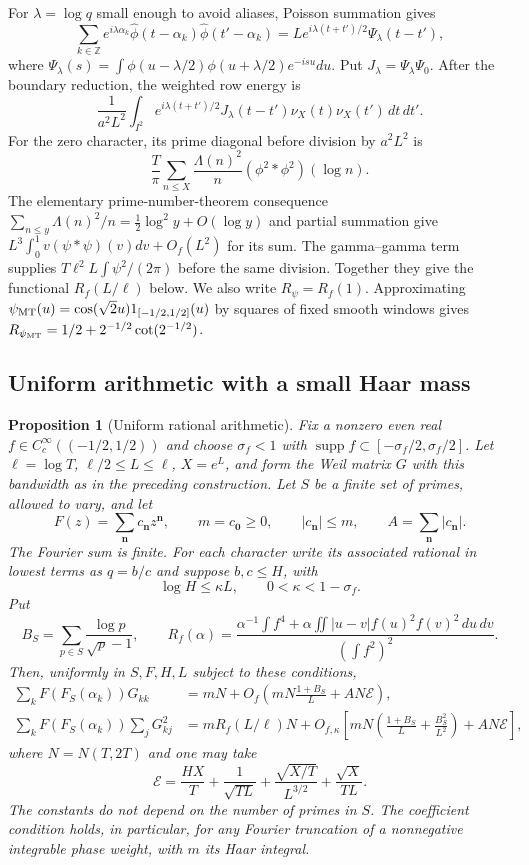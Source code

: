 \documentclass[11pt,letterpaper]{article}
\newtheorem{proposition}[theorem]{Proposition}
\theoremstyle{definition}
\theoremstyle{remark}
\newcommand{\1}{\mathbf 1}
\begin{document}
For $\lambda=\log q$ small enough to avoid aliases, Poisson
summation gives
\[
 \sum_{k\in\mathbb Z}e^{i\lambda\alpha_k}
 \widehat\phi(t-\alpha_k)\widehat\phi(t'-\alpha_k)
 =Le^{i\lambda(t+t')/2}\Psi_\lambda(t-t'),
\]
where $\Psi_\lambda(s)=\int\phi(u-\lambda/2)
\phi(u+\lambda/2)e^{-isu}du$.
Put $J_\lambda=\Psi_\lambda\Psi_0$. After the boundary
reduction, the weighted row energy is
\[
 \frac1{a^2L^2}\int_{I^2}e^{i\lambda(t+t')/2}
        J_\lambda(t-t')\nu_X(t)\nu_X(t')\,dt\,dt'.
\]
For the zero character, its prime diagonal before division by
$a^2L^2$ is
\[
 \frac T\pi\sum_{n\le X}\frac{\Lambda(n)^2}{n}
                         (\phi^2*\phi^2)(\log n).
\]
The elementary prime-number-theorem consequence
$\sum_{n\le y}\Lambda(n)^2/n=\frac12\log^2y+O(\log y)$
and partial summation give
$L^3\int_0^1v(\psi*\psi)(v)dv+O_f(L^2)$ for its sum.
The gamma--gamma term supplies
$T\ell^2L\int\psi^2/(2\pi)$ before the same division.
Together they give the functional $R_f(L/\ell)$ below.
We also write $R_\psi=R_f(1)$. Approximating
$\psi_{\rm MT}(u)=\cos(\sqrt2u)1_{[-1/2,1/2]}(u)$ by squares
of fixed smooth windows gives
$R_{\psi_{\rm MT}}=1/2+2^{-1/2}\cot(2^{-1/2})$.

\subsection{Uniform arithmetic with a small Haar mass}


\begin{proposition}[Uniform rational arithmetic]\label{p04:prop:uniform-rational-arithmetic}
Fix a nonzero even real $f\in C_c^\infty((-1/2,1/2))$ and choose
$\sigma_f<1$ with $\operatorname{supp}f\subset[-\sigma_f/2,\sigma_f/2]$.
Let $\ell=\log T$, $\ell/2\le L\le\ell$, $X=e^L$, and form the Weil
matrix $G$ with this bandwidth as in the preceding construction.
Let $S$ be a finite set of primes, allowed to vary, and let
\[
 F(z)=\sum_{\mathbf n}c_{\mathbf n}z^{\mathbf n},\qquad
 m=c_{\mathbf0}\ge0,\qquad
 |c_{\mathbf n}|\le m,\qquad
 A=\sum_{\mathbf n}|c_{\mathbf n}|.
\]
The Fourier sum is finite. For each character write its associated
rational in lowest terms as $q=b/c$ and suppose $b,c\le H$, with
\[
 \log H\le\kappa L,\qquad 0<\kappa<1-\sigma_f.
\]
Put
\[
 B_S=\sum_{p\in S}\frac{\log p}{\sqrt p-1},\qquad
 R_f(\alpha)=\frac{\alpha^{-1}\int f^4+
 \alpha\iint|u-v|f(u)^2f(v)^2\,du\,dv}{(\int f^2)^2}.
\]
Then, uniformly in $S,F,H,L$ subject to these conditions,
\begin{align*}
 \sum_k F(F_S(\alpha_k))G_{kk}
 &=mN+O_f\!\left(mN\frac{1+B_S}{L}+AN\mathcal E\right),\\
 \sum_k F(F_S(\alpha_k))\sum_jG_{kj}^2
 &=mR_f(L/\ell)N+
 O_{f,\kappa}\!\left[mN\left(\frac{1+B_S}{L}
                       +\frac{B_S^2}{L^2}\right)+AN\mathcal E\right],
\end{align*}
where $N=N(T,2T)$ and one may take
\[
 \mathcal E=\frac{HX}{T}+\frac1{\sqrt{TL}}+
             \frac{\sqrt{X/T}}{L^{3/2}}+
             \frac{\sqrt X}{TL}.
\]
The constants do not depend on the number of primes in $S$.
The coefficient condition holds, in particular, for any Fourier
truncation of a nonnegative integrable phase weight, with $m$ its
Haar integral.
\end{proposition}
\end{document}
